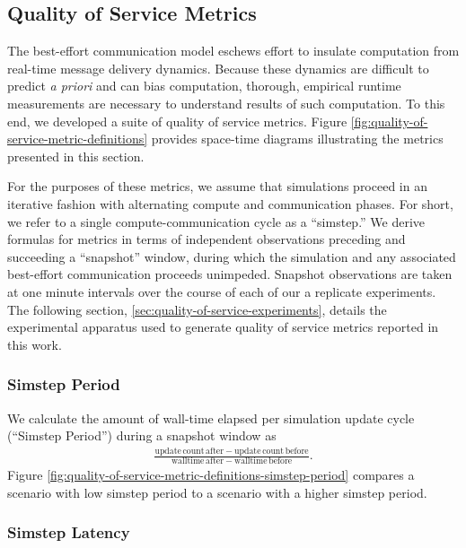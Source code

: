 \subsection{Quality of Service Metrics} \label{sec:quality-of-service-metrics}



The best-effort communication model eschews effort to insulate computation from real-time message delivery dynamics.
Because these dynamics are difficult to predict \textit{a priori} and can bias computation, thorough, empirical runtime measurements are necessary to understand results of such computation.
To this end, we developed a suite of quality of service metrics.
Figure \ref{fig:quality-of-service-metric-definitions} provides space-time diagrams illustrating the metrics presented in this section.

For the purposes of these metrics, we assume that simulations proceed in an iterative fashion with alternating compute and communication phases.
For short, we refer to a single compute-communication cycle as a ``simstep.''
We derive formulas for metrics in terms of independent observations preceding and succeeding a ``snapshot'' window, during which the simulation and any associated best-effort communication proceeds unimpeded.
Snapshot observations are taken at one minute intervals over the course of each of our a replicate experiments.
The following section, \ref{sec:quality-of-service-experiments}, details the experimental apparatus used to generate quality of service metrics reported in this work.

\subsubsection{Simstep Period} \label{sec:simstep-period-metric}

We calculate the amount of wall-time elapsed per simulation update cycle (``Simstep Period'') during a snapshot window as
\begin{align*}
\frac{
  \mathrm{update\,count\,after} - \mathrm{update\,count\,before}
}{
  \mathrm{walltime\,after} - \mathrm{walltime\,before}
}.
\end{align*}
Figure \ref{fig:quality-of-service-metric-definitions-simstep-period} compares a scenario with low simstep period to a scenario with a higher simstep period.

\subsubsection{Simstep Latency} \label{sec:wall-time-latency-metric}

